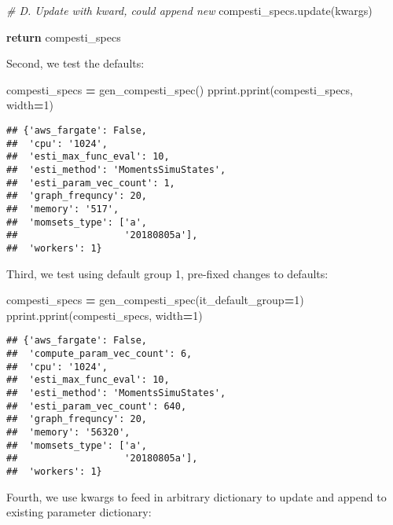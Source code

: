 \documentclass[
]{book}
\newenvironment{Shaded}{\begin{snugshade}}{\end{snugshade}}
\newcommand{\CommentTok}[1]{\textcolor[rgb]{0.56,0.35,0.01}{\textit{#1}}}
\newcommand{\ControlFlowTok}[1]{\textcolor[rgb]{0.13,0.29,0.53}{\textbf{#1}}}
\newcommand{\DecValTok}[1]{\textcolor[rgb]{0.00,0.00,0.81}{#1}}
\newcommand{\NormalTok}[1]{#1}
\newcommand{\OperatorTok}[1]{\textcolor[rgb]{0.81,0.36,0.00}{\textbf{#1}}}
\begin{document}
\begin{Shaded}
\begin{Highlighting}[]
    \CommentTok{\# D. Update with kward, could append new}
\NormalTok{    compesti\_specs.update(kwargs)}

    \ControlFlowTok{return}\NormalTok{ compesti\_specs}
\end{Highlighting}
\end{Shaded}

Second, we test the defaults:

\begin{Shaded}
\begin{Highlighting}[]
\NormalTok{compesti\_specs }\OperatorTok{=}\NormalTok{ gen\_compesti\_spec()}
\NormalTok{pprint.pprint(compesti\_specs, width}\OperatorTok{=}\DecValTok{1}\NormalTok{)}
\end{Highlighting}
\end{Shaded}

\begin{verbatim}
## {'aws_fargate': False,
##  'cpu': '1024',
##  'esti_max_func_eval': 10,
##  'esti_method': 'MomentsSimuStates',
##  'esti_param_vec_count': 1,
##  'graph_frequncy': 20,
##  'memory': '517',
##  'momsets_type': ['a',
##                   '20180805a'],
##  'workers': 1}
\end{verbatim}

Third, we test using default group 1, pre-fixed changes to defaults:

\begin{Shaded}
\begin{Highlighting}[]
\NormalTok{compesti\_specs }\OperatorTok{=}\NormalTok{ gen\_compesti\_spec(it\_default\_group}\OperatorTok{=}\DecValTok{1}\NormalTok{)}
\NormalTok{pprint.pprint(compesti\_specs, width}\OperatorTok{=}\DecValTok{1}\NormalTok{)}
\end{Highlighting}
\end{Shaded}

\begin{verbatim}
## {'aws_fargate': False,
##  'compute_param_vec_count': 6,
##  'cpu': '1024',
##  'esti_max_func_eval': 10,
##  'esti_method': 'MomentsSimuStates',
##  'esti_param_vec_count': 640,
##  'graph_frequncy': 20,
##  'memory': '56320',
##  'momsets_type': ['a',
##                   '20180805a'],
##  'workers': 1}
\end{verbatim}

Fourth, we use kwargs to feed in arbitrary dictionary to update and append to existing parameter dictionary:
\end{document}
